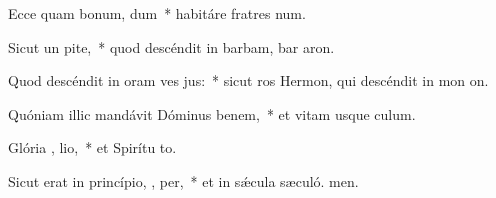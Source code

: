 \item Ecce quam bonum,   dum~* habitáre fratres  num.
\item Sicut un  pite,~* quod descéndit in barbam, bar aron.
\item Quod descéndit in oram ves jus:~* sicut ros Hermon, qui descéndit in mon on.
\item Quóniam illic mandávit Dóminus benem,~* et vitam usque  culum.
\item Glória ,  lio,~* et Spirítu to.
\item Sicut erat in princípio,  ,  per,~* et in sǽcula sæculó. men.
